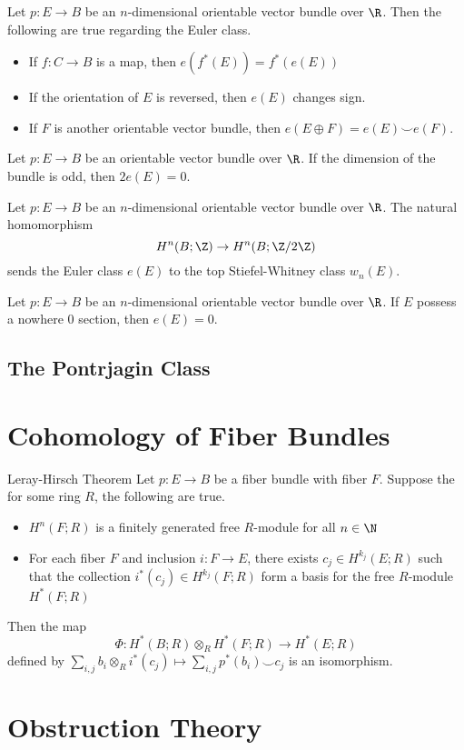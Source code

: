 \documentclass[a4paper]{article}
\begin{document}
\begin{prp}{}{} Let $p:E\to B$ be an $n$-dimensional orientable vector bundle over $\R$. Then the following are true regarding the Euler class. 
\begin{itemize}
\item If $f:C\to B$ is a map, then $e(f^\ast(E))=f^\ast(e(E))$
\item If the orientation of $E$ is reversed, then $e(E)$ changes sign. 
\item If $F$ is another orientable vector bundle, then $e(E\oplus F)=e(E)\smile e(F)$. 
\end{itemize}
\end{prp}

\begin{prp}{}{} Let $p:E\to B$ be an orientable vector bundle over $\R$. If the dimension of the bundle is odd, then $2e(E)=0$. 
\end{prp}

\begin{prp}{}{} Let $p:E\to B$ be an $n$-dimensional orientable vector bundle over $\R$. The natural homomorphism $$H^n(B;\Z)\to H^n(B;\Z/2\Z)$$ sends the Euler class $e(E)$ to the top Stiefel-Whitney class $w_n(E)$. 
\end{prp}

\begin{prp}{}{} Let $p:E\to B$ be an $n$-dimensional orientable vector bundle over $\R$. If $E$ possess a nowhere $0$ section, then $e(E)=0$. 
\end{prp}

\subsection{The Pontrjagin Class}

\pagebreak
\section{Cohomology of Fiber Bundles}

\begin{thm}{Leray-Hirsch Theorem}{} Let $p:E\to B$ be a fiber bundle with fiber $F$. Suppose the for some ring $R$, the following are true. 
\begin{itemize}
\item $H^n(F;R)$ is a finitely generated free $R$-module for all $n\in\N$
\item For each fiber $F$ and inclusion $i:F\to E$, there exists $c_j\in H^{k_j}(E;R)$ such that the collection $i^\ast(c_j)\in H^{k_j}(F;R)$ form a basis for the free $R$-module $H^\ast(F;R)$
\end{itemize}
Then the map $$\Phi:H^\ast(B;R)\otimes_R H^\ast(F;R)\to H^\ast(E;R)$$ defined by $\sum_{i,j}b_i\otimes_R i^\ast(c_j)\mapsto\sum_{i,j} p^\ast(b_i)\smile c_j$ is an isomorphism. 
\end{thm}

\pagebreak
\section{Obstruction Theory}
\end{document}
